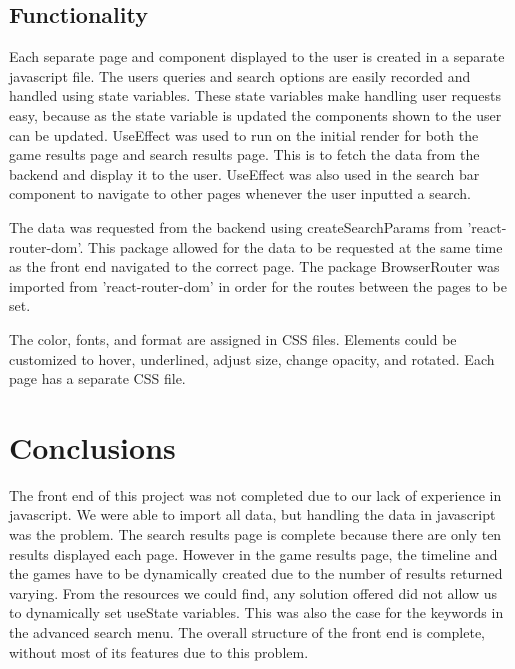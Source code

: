 \subsection{Functionality}
Each separate page and component displayed to the user is created in a separate javascript file. The users queries and search options are easily recorded and handled using state variables. These state variables make handling user requests easy, because as the state variable is updated the components shown to the user can be updated. UseEffect was used to run on the initial render for both the game results page and search results page. This is to fetch the data from the backend and display it to the user. UseEffect was also used in the search bar component to navigate to other pages whenever the user inputted a search. 

The data was requested from the backend using createSearchParams from 'react-router-dom'. This package allowed for the data to be requested at the same time as the front end navigated to the correct page. The package BrowserRouter was imported from 'react-router-dom' in order for the routes between the pages to be set. 

The color, fonts, and format are assigned in CSS files. Elements could be customized to hover, underlined, adjust size, change opacity, and rotated. Each page has a separate CSS file. 

\section{Conclusions}
The front end of this project was not completed due to our lack of experience in javascript. We were able to import all data, but handling the data in javascript was the problem. The search results page is complete because there are only ten results displayed each page. However in the game results page, the timeline and the games have to be dynamically created due to the number of results returned varying. From the resources we could find, any solution offered did not allow us to dynamically set useState variables. This was also the case for the keywords in the advanced search menu. The overall structure of the front end is complete, without most of its features due to this problem. 




